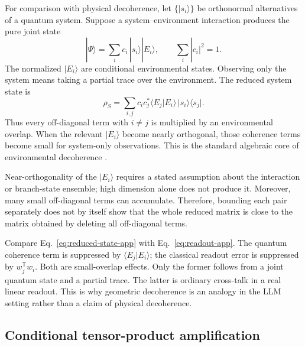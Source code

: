 \documentclass[
  aps,
  reprint,
  superscriptaddress,
  floatfix,
  nofootinbib,
  longbibliography
]{revtex4-2}
\newcommand{\T}{^{\mathsf T}}
\begin{document}
For comparison with physical decoherence, let
$\{|s_i\rangle\}$ be orthonormal alternatives of a quantum system.  Suppose a
system--environment interaction produces the pure joint state
\begin{equation}
 |\Psi\rangle=\sum_i c_i\,|s_i\rangle|E_i\rangle,
 \qquad \sum_i|c_i|^2=1.
 \label{eq:branch-state-app}
\end{equation}
The normalized $|E_i\rangle$ are conditional environmental states.  Observing
only the system means taking a partial trace over the environment.  The
reduced system state is
\begin{equation}
 \rho_S
 =\sum_{i,j}c_i c_j^*
 \langle E_j|E_i\rangle\,|s_i\rangle\langle s_j|.
 \label{eq:reduced-state-app}
\end{equation}
Thus every off-diagonal term with $i\ne j$ is multiplied by an environmental
overlap.  When the relevant $|E_i\rangle$ become nearly orthogonal, those
coherence terms become small for system-only observations.  This is the
standard algebraic core of environmental decoherence
\cite{RevModPhys.75.715}.

Near-orthogonality of the $|E_i\rangle$ requires a stated assumption about the
interaction or branch-state ensemble; high dimension alone does not produce
it.  Moreover, many small off-diagonal terms can accumulate.  Therefore,
bounding each pair separately does not by itself show that the whole reduced
matrix is close to the matrix obtained by deleting all off-diagonal terms.

Compare Eq.~\eqref{eq:reduced-state-app} with
Eq.~\eqref{eq:readout-app}.  The quantum coherence term is suppressed by
$\langle E_j|E_i\rangle$; the classical readout error is suppressed by
$w_j\T w_i$.  Both are small-overlap effects.  Only the former follows from a
joint quantum state and a partial trace.  The latter is ordinary cross-talk in
a real linear readout.  This is why geometric decoherence is an analogy in the
LLM setting rather than a claim of physical decoherence.

\subsection{Conditional tensor-product amplification}
\end{document}

